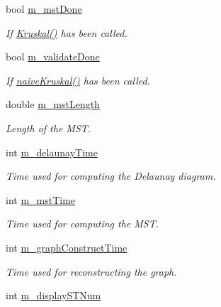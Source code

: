\begin{DoxyCompactItemize}
\item 
bool \hyperlink{classcmst_1_1_graph2_d_ab7c087fe87b5750195100ff25f10f628}{m\+\_\+mst\+Done}
\begin{DoxyCompactList}\small\item\em If \hyperlink{classcmst_1_1_graph2_d_a034d2d37b2d106c0e25d7ad7bc67907e}{Kruskal()} has been called. \end{DoxyCompactList}\item 
bool \hyperlink{classcmst_1_1_graph2_d_ae609751f322449c3ac98303a8d6fa747}{m\+\_\+validate\+Done}
\begin{DoxyCompactList}\small\item\em If \hyperlink{classcmst_1_1_graph2_d_af0db14845e80799be1d4fb15ca230110}{naive\+Kruskal()} has been called. \end{DoxyCompactList}\item 
double \hyperlink{classcmst_1_1_graph2_d_a722498b25b96d26e68e378ba970d5e65}{m\+\_\+mst\+Length}
\begin{DoxyCompactList}\small\item\em Length of the M\+ST. \end{DoxyCompactList}\item 
int \hyperlink{classcmst_1_1_graph2_d_a869a2fef63a6dbc8733056afd9ad0b71}{m\+\_\+delaunay\+Time}
\begin{DoxyCompactList}\small\item\em Time used for computing the Delaunay diagram. \end{DoxyCompactList}\item 
int \hyperlink{classcmst_1_1_graph2_d_a447f3d36666c57d2f15bddc1e3126f1e}{m\+\_\+mst\+Time}
\begin{DoxyCompactList}\small\item\em Time used for computing the M\+ST. \end{DoxyCompactList}\item 
int \hyperlink{classcmst_1_1_graph2_d_ac594da90a2c9bd7332644532969ef11f}{m\+\_\+graph\+Construct\+Time}
\begin{DoxyCompactList}\small\item\em Time used for reconstructing the graph. \end{DoxyCompactList}\item 
int \hyperlink{classcmst_1_1_graph2_d_aa5479777b7d8650b85c15b1f8a54bd95}{m\+\_\+display\+S\+T\+Num}
\end{DoxyCompactItemize}


